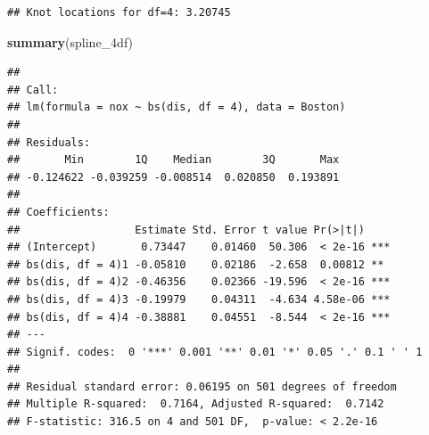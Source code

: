 \documentclass[
]{article}
\newenvironment{Shaded}{\begin{snugshade}}{\end{snugshade}}
\newcommand{\AttributeTok}[1]{\textcolor[rgb]{0.13,0.29,0.53}{#1}}
\newcommand{\CommentTok}[1]{\textcolor[rgb]{0.56,0.35,0.01}{\textit{#1}}}
\newcommand{\DecValTok}[1]{\textcolor[rgb]{0.00,0.00,0.81}{#1}}
\newcommand{\FunctionTok}[1]{\textcolor[rgb]{0.13,0.29,0.53}{\textbf{#1}}}
\newcommand{\NormalTok}[1]{#1}
\newcommand{\OtherTok}[1]{\textcolor[rgb]{0.56,0.35,0.01}{#1}}
\newcommand{\SpecialCharTok}[1]{\textcolor[rgb]{0.81,0.36,0.00}{\textbf{#1}}}
\newcommand{\StringTok}[1]{\textcolor[rgb]{0.31,0.60,0.02}{#1}}
\begin{document}
\begin{Shaded}
\end{Shaded}

\begin{verbatim}
## Knot locations for df=4: 3.20745
\end{verbatim}

\begin{Shaded}
\begin{Highlighting}[]
\FunctionTok{summary}\NormalTok{(spline\_4df)}
\end{Highlighting}
\end{Shaded}

\begin{verbatim}
## 
## Call:
## lm(formula = nox ~ bs(dis, df = 4), data = Boston)
## 
## Residuals:
##       Min        1Q    Median        3Q       Max 
## -0.124622 -0.039259 -0.008514  0.020850  0.193891 
## 
## Coefficients:
##                  Estimate Std. Error t value Pr(>|t|)    
## (Intercept)       0.73447    0.01460  50.306  < 2e-16 ***
## bs(dis, df = 4)1 -0.05810    0.02186  -2.658  0.00812 ** 
## bs(dis, df = 4)2 -0.46356    0.02366 -19.596  < 2e-16 ***
## bs(dis, df = 4)3 -0.19979    0.04311  -4.634 4.58e-06 ***
## bs(dis, df = 4)4 -0.38881    0.04551  -8.544  < 2e-16 ***
## ---
## Signif. codes:  0 '***' 0.001 '**' 0.01 '*' 0.05 '.' 0.1 ' ' 1
## 
## Residual standard error: 0.06195 on 501 degrees of freedom
## Multiple R-squared:  0.7164, Adjusted R-squared:  0.7142 
## F-statistic: 316.5 on 4 and 501 DF,  p-value: < 2.2e-16
\end{verbatim}
\end{document}
